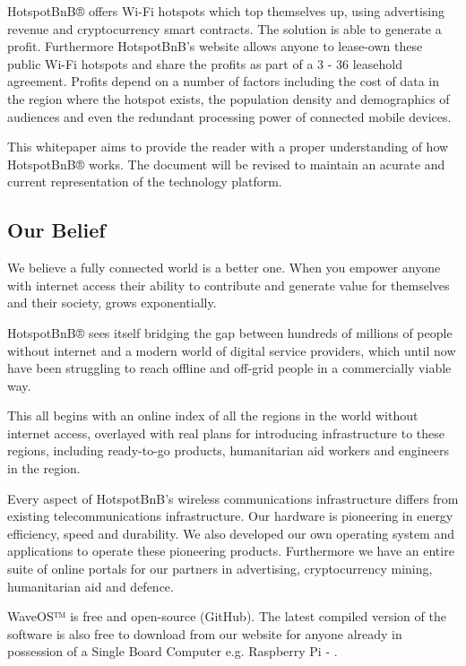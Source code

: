 \documentclass[letterpaper,10pt,openany,oneside,english]{sphinxmanual}
\begin{document}
HotspotBnB® offers Wi-Fi hotspots which top themselves up, using advertising revenue and cryptocurrency smart contracts. The solution is able to generate a profit. Furthermore HotspotBnB’s website allows anyone to lease-own these public Wi-Fi hotspots and share the profits as part of a 3 - 36 leasehold agreement. Profits depend on a number of factors including the cost of data in the region where the hotspot exists, the population density and demographics of audiences and even the redundant processing power of connected mobile devices.

This whitepaper aims to provide the reader with a proper understanding of how HotspotBnB® works. The document will be revised to maintain an acurate and current representation of the technology platform.


\subsection{Our Belief}
\label{\detokenize{vision:our-belief}}
We believe a fully connected world is a better one. When you empower anyone with internet access their ability to contribute and generate value for themselves and their society, grows exponentially.

HotspotBnB® sees itself bridging the gap between hundreds of millions of people without internet and a modern world of digital service providers, which until now have been struggling to reach offline and off-grid people in a commercially viable way.

This all begins with an online index of all the regions in the world without internet access, overlayed with real plans for introducing infrastructure to these regions, including ready-to-go products, humanitarian aid workers and engineers in the region.

Every aspect of HotspotBnB’s wireless communications infrastructure differs from existing telecommunications infrastructure. Our hardware is pioneering in energy efficiency, speed and durability. We also developed our own operating system and applications to operate these pioneering products. Furthermore we have an entire suite of online portals for our partners in advertising, cryptocurrency mining, humanitarian aid and defence.

WaveOS™ is free and open-source (GitHub). The latest compiled version of the software is also free to download from our website for anyone already in possession of a Single Board Computer e.g. Raspberry Pi - .
\end{document}
